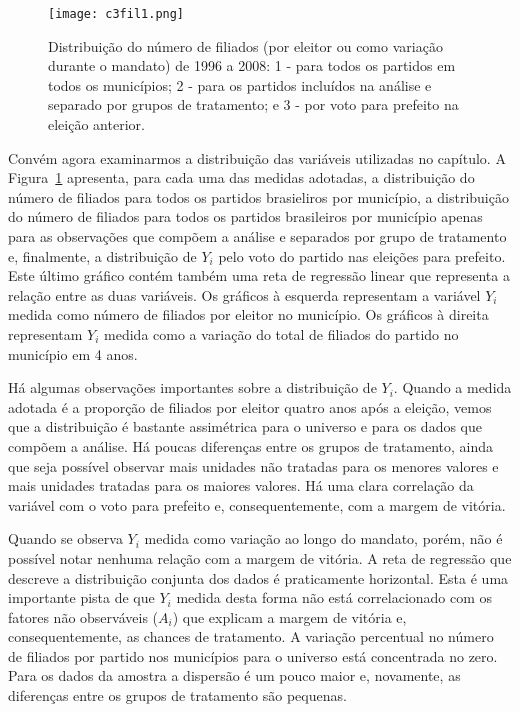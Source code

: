 \begin{figure}[htp]
	\centering
	\texttt{[image: c3fil1.png]}
	\caption{Distribuição do número de filiados (por eleitor ou como variação durante o mandato) de 1996 a 2008: 1 - para todos os partidos em todos os municípios; 2 - para os partidos incluídos na análise e separado por grupos de tratamento; e 3 - por voto para prefeito na eleição anterior.}
	\label{fig:c3fil1}
\end{figure}

Convém agora examinarmos a distribuição das variáveis utilizadas no capítulo. A Figura~\ref{fig:c3fil1} apresenta, para cada uma das medidas adotadas, a distribuição do número de filiados para todos os partidos brasieliros por município, a distribuição do número de filiados para todos os partidos brasileiros por município apenas para as observações que compõem a análise e separados por grupo de tratamento e, finalmente, a distribuição de $Y_{i}$ pelo voto do partido nas eleições para prefeito. Este último gráfico contém também uma reta de regressão linear que representa a relação entre as duas variáveis. Os gráficos à esquerda representam a variável $Y_{i}$ medida como número de filiados por eleitor no município. Os gráficos à direita representam $Y_{i}$ medida como a variação do total de filiados do partido no município em 4 anos. 

Há algumas observações importantes sobre a distribuição de $Y_{i}$. Quando a medida adotada é a proporção de filiados por eleitor quatro anos após a eleição, vemos que a distribuição é bastante assimétrica para o universo e para os dados que compõem a análise. Há poucas diferenças entre os grupos de tratamento, ainda que seja possível observar mais unidades não tratadas para os menores valores e mais unidades tratadas para os maiores valores. Há uma clara correlação da variável com o voto para prefeito e, consequentemente, com a margem de vitória.

Quando se observa $Y_{i}$ medida como variação ao longo do mandato, porém, não é possível notar nenhuma relação com a margem de vitória. A reta de regressão que descreve a distribuição conjunta dos dados é praticamente horizontal. Esta é uma importante pista de que $Y_{i}$ medida desta forma não está correlacionado com os fatores não observáveis ($A_{i}$)  que explicam a margem de vitória e, consequentemente, as chances de tratamento. A variação percentual no número de filiados por partido nos municípios para o universo está concentrada no zero. Para os dados da amostra a dispersão é um pouco maior e, novamente, as diferenças entre os grupos de tratamento são pequenas.

